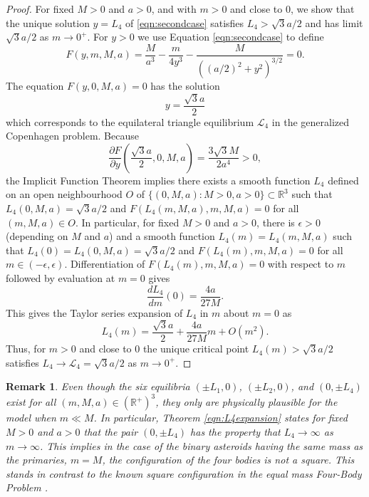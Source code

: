\documentclass[12pt]{article}
\newtheorem{remark}{Remark}%
\begin{document}
\begin{proof}
For fixed $M>0$ and $a>0$, and with $m>0$ and close to $0$, we show that the unique solution $y=L_4$ of \eqref{eqn:secondcase} satisfies $L_4>\sqrt 3 a/2$ and has limit $\sqrt 3 a/2$ as $m\to 0^+$. For $y>0$ we use Equation \eqref{eqn:secondcase} to define
\begin{equation}\label{eqn:kite}
F(y,m,M,a) = \frac{M}{a^3} - \frac{m}{4y^3}  - \frac{M}{((a/2)^2 + y^2)^{3/2}} = 0.
\end{equation}
The equation $F(y,0,M,a) = 0$ has the solution
\[ y = \frac{\sqrt 3 a}{2}\]
which corresponds to the equilateral triangle equilibrium ${\mathcal L}_4$ in the generalized Copenhagen problem. Because
\[
\frac{\partial F}{\partial y}\left( \frac{\sqrt 3 a}{2},0,M,a\right)
= \frac{3\sqrt 3 M}{2 a^4} > 0,\]
the Implicit Function Theorem implies there exists a smooth function $L_4$ defined on an open neighbourhood $O$ of $\{(0,M,a):M>0,a>0\}\subset {\mathbb R}^3$ such that $L_4(0,M,a) = \sqrt 3 a/2$ and $F(L_4(m,M,a),m,M,a) = 0$ for all $(m,M,a)\in O$. In particular, for fixed $M>0$ and $a>0$, there is $\epsilon>0$ (depending on $M$ and $a$) and a smooth function $L_4(m) = L_4(m,M,a)$ such that $L_4(0)=L_4(0,M,a) = \sqrt 3 a/2$ and $F(L_4(m),m,M,a) = 0$ for all $m\in (-\epsilon,\epsilon)$. Differentiation of $F(L_4(m),m,M,a) = 0$ with respect to $m$ followed by evaluation at $m=0$ gives
\[
\frac{dL_4}{dm}(0) =\frac{4a}{27M}.
\]
This gives the Taylor series expansion of $L_4$ in $m$ about $m=0$ as
\begin{equation}\label{eqn:L4expansion}
L_4(m) = \frac{\sqrt 3 a}{2} + \frac{4a}{27 M} m + O(m^2).
\end{equation}
Thus, for $m>0$ and close to $0$ the unique critical point $L_4(m)>\sqrt 3 a/2$ satisfies $L_4\to {\mathcal L}_4 = \sqrt 3 a /2$ as $m\to 0^+$.
\end{proof}

\begin{remark}
Even though the six equilibria $(\pm L_1,0)$, $(\pm L_2,0)$, and $(0,\pm L_4)$ exist for all $(m,M,a)\in ({\mathbb R}^+)^3$, they only are physically plausible for the model when $m \ll M$. In particular, Theorem \ref{eqn:L4expansion} states for fixed $M>0$ and $a>0$ that the pair $(0,\pm L_4)$ has the property that $L_4\to \infty$ as $m\to \infty$. This implies in the case of the binary asteroids having the same mass as the primaries, $m=M$, the configuration of the four bodies is not a square. This stands in contrast to the known square configuration in the equal mass Four-Body Problem \cite{Roy}.
\end{remark}
\end{document}
